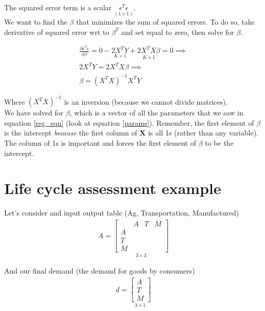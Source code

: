 \documentclass{article}
\begin{document}
The squared error term is a scalar $\underset{(1 \times 1)}{\epsilon^T \epsilon}$. \\

We want to find the $\beta$ that minimizes the sum of squared errors. To do so, take derivative of squared error wrt to $\beta^T$ and set equal to zero, then solve for $\beta$. 

\begin{align}
    \frac{\partial \epsilon^T  \epsilon }{ \partial \beta} = 0 - \underset{K \times 1}{2X^T Y} + \underset{K \times 1}{2 X^T X \beta} = 0 \implies \\
    2X^T Y = 2 X^T X \beta \implies \\
    \beta = {(X^T X)}^{-1} X^T Y
\end{align}

Where ${(X^T X)}^{-1}$ is an inversion (because we cannot divide matrices). \\

We have solved for $\beta$, which is a vector of all the parameters that we saw in equation \ref{reg_eqn} (look at equation \ref{params}). Remember, the first element of $\beta$ is the intercept \textit{because} the first column of $\mathbf{X}$ is all 1s (rather than any variable). The column of 1s is important and forces the first element of $\beta$ to be the intercept. 

\section{Life cycle assessment example}

Let's consider and input output table (Ag, Transportation, Manufactured)
\begin{align}
    A = \underset{ 3 \times 3}{\begin{bmatrix}
         & A & T & M \\
         A \\
         T\\
         M
    \end{bmatrix}}
\end{align}

And our final demand (the demand for goods by consumers) 
\begin{align}
    d = \underset{3 \times 1}{\begin{bmatrix}
        A \\
        T\\
        M
    \end{bmatrix}}
\end{align}
\end{document}
